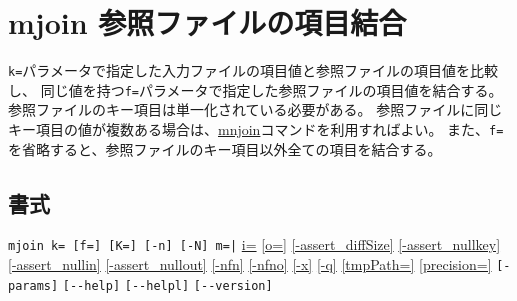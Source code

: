 
%

\section{mjoin 参照ファイルの項目結合\label{sect:mjoin}}
\verb|k=|パラメータで指定した入力ファイルの項目値と参照ファイルの項目値を比較し、
同じ値を持つ\verb|f=|パラメータで指定した参照ファイルの項目値を結合する。
参照ファイルのキー項目は単一化されている必要がある。
参照ファイルに同じキー項目の値が複数ある場合は、\hyperref[sect:mnjoin]{mnjoin}コマンドを利用すればよい。
また、\verb|f=|を省略すると、参照ファイルのキー項目以外全ての項目を結合する。

\subsection*{書式}
\verb/mjoin k= [f=] [K=] [-n] [-N] m=|/ 
\hyperref[sect:option_i]{i=}
\hyperref[sect:option_o]{[o=]}
\hyperref[sect:option_assert_diffSize]{[-assert\_diffSize]}
\hyperref[sect:option_assert_nullkey]{[-assert\_nullkey]}
\hyperref[sect:option_assert_nullin]{[-assert\_nullin]}
\hyperref[sect:option_assert_nullout]{[-assert\_nullout]}
\hyperref[sect:option_nfn]{[-nfn]} 
\hyperref[sect:option_nfno]{[-nfno]}  
\hyperref[sect:option_x]{[-x]}
\hyperref[sect:option_q]{[-q]}
\hyperref[sect:option_option_tmppath]{[tmpPath=]}
\hyperref[sect:option_precision]{[precision=]}
\verb|[-params]|
\verb|[--help]|
\verb|[--helpl]|
\verb|[--version]|\\

